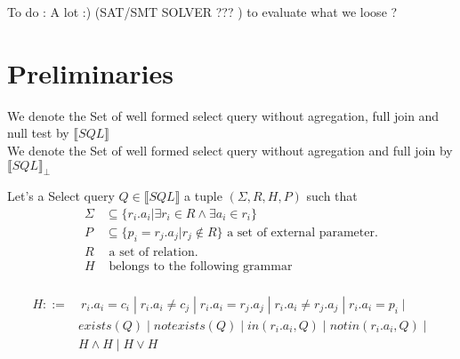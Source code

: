 
To do : A lot :) 
(SAT/SMT SOLVER ??? ) to evaluate what we loose ?  

\section{Preliminaries}

\begin{mydef}
	We denote the Set of well formed select query without agregation, full join and null test by $\llbracket SQL\rrbracket$
	\\We denote the Set of well formed select query without agregation and full join by $\llbracket SQL\rrbracket _\bot$
\end{mydef}

\begin{mydef}
Let's a Select query $Q \in \llbracket SQL\rrbracket$ a tuple $(\Sigma,R,H,P)$ such that
\begin{align*}
\Sigma & \subseteq \{r_i.a_i | \exists r_i \in R \land \exists a_i \in r_i \} \\
P & \subseteq \{p_i = r_j.a_j | r_j \notin R\} \mbox{ a set of external parameter.}\\
R & \mbox{ a set of relation.}\\
H &  \mbox{ belongs to the following grammar}\\
\end{align*}

\begin{align*}
H ::= &\ r_i.a_i = c_i \; |\; r_i.a_i \neq c_j \; |\; r_i.a_i = r_j.a_j \; |\;  r_i.a_i \neq r_j.a_j \;  |\; r_i.a_i = p_i\; |\; 
\\ &  exists(Q) \; |\; notexists(Q) \; |\; in(r_i.a_i,Q) \; |\; notin(r_i.a_i,Q) \; |\; 
\\ & H\land H \; |\; H \lor H 
\\
\end{align*}

\end{mydef}

